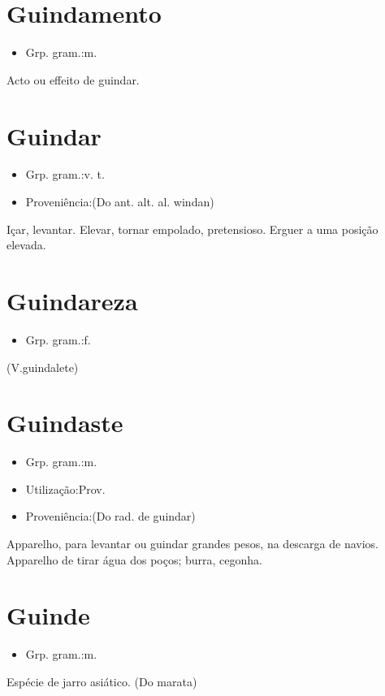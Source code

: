 \section{Guindamento}
\begin{itemize}
\item {Grp. gram.:m.}
\end{itemize}
Acto ou effeito de guindar.
\section{Guindar}
\begin{itemize}
\item {Grp. gram.:v. t.}
\end{itemize}
\begin{itemize}
\item {Proveniência:(Do ant. alt. al. \textunderscore windan\textunderscore )}
\end{itemize}
Içar, levantar.
Elevar, tornar empolado, pretensioso.
Erguer a uma posição elevada.
\section{Guindareza}
\begin{itemize}
\item {Grp. gram.:f.}
\end{itemize}
(V.guindalete)
\section{Guindaste}
\begin{itemize}
\item {Grp. gram.:m.}
\end{itemize}
\begin{itemize}
\item {Utilização:Prov.}
\end{itemize}
\begin{itemize}
\item {Proveniência:(Do rad. de \textunderscore guindar\textunderscore )}
\end{itemize}
Apparelho, para levantar ou guindar grandes pesos, na descarga de navios.
Apparelho de tirar água dos poços; burra, cegonha.
\section{Guinde}
\begin{itemize}
\item {Grp. gram.:m.}
\end{itemize}
Espécie de jarro asiático.
(Do marata)
